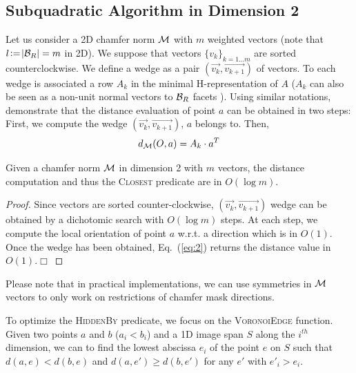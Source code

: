 \documentclass{llncs}
\begin{document}
\subsection{Subquadratic Algorithm in Dimension 2}
\label{sec:subq-algor-dimens}

Let us consider a 2D chamfer norm $\mathcal{M}$ with $m$ weighted vectors (note
that $l\!\mathrel{\mathop:}=\!|\mathcal{B}_R| = m$ in 2D). We suppose that vectors
$\{v_k\}_{k=1\ldots m}$ are sorted counterclockwise. We define a wedge
as a pair $(\vec{v_k},\vec{v_{k+1}})$ of vectors. To each wedge is
associated a row $A_k$ in the minimal H-representation of $A$ ($A_k$
can also be seen as a non-unit normal vectors to $\mathcal{B}_R$ facets
\cite{DBLP:journals/pr/NormandE09}). Using similar notations,
\cite{Thiel_hdr,Strand2008} demonstrate that the distance evaluation
of point $a$ can be obtained in two steps: First, we compute the wedge
$(\vec{v_k},\vec{v_{k+1}})$, $a$ belongs to. Then,
\begin{equation}
\label{eq:2}
  d_{\mathcal{M}}(O,a) = A_k\cdot a^T
\end{equation}

\begin{lemma}
\label{lem:log}
  Given a chamfer norm $\mathcal{M}$ in dimension 2 with $m$ vectors, the distance computation
  and thus the \textsc{Closest} predicate are in $O(\log{m})$.
\end{lemma}
\begin{proof}
  Since vectors are sorted counter-clockwise,
  $(\vec{v_k},\vec{v_{k+1}})$ wedge can be obtained by a dichotomic
  search with $O(\log{m})$ steps. At each step, we compute the local
  orientation of point $a$ w.r.t. a direction which is in $O(1)$. Once
  the wedge has been obtained, Eq.~(\ref{eq:2}) returns the distance
  value in $O(1)$.$\Box$
\end{proof}

Please note that in practical implementations, we can use symmetries
in $\mathcal{M}$ vectors to only work on restrictions of chamfer mask
directions.

To optimize the \textsc{HiddenBy} predicate, we focus on the
\textsc{VoronoiEdge} function. Given two points $a$ and $b$
($a_i<b_i$) and a 1D image span $S$ along the $i^{th}$ dimension, we
can to find the lowest abscissa $e_i$ of the point $e$ on $S$ such
that $d(a,e) < d(b,e)$ and $d(a,e')\geq d(b, e')$ for any $e'$ with
$e'_i>e_i$.
\end{document}
